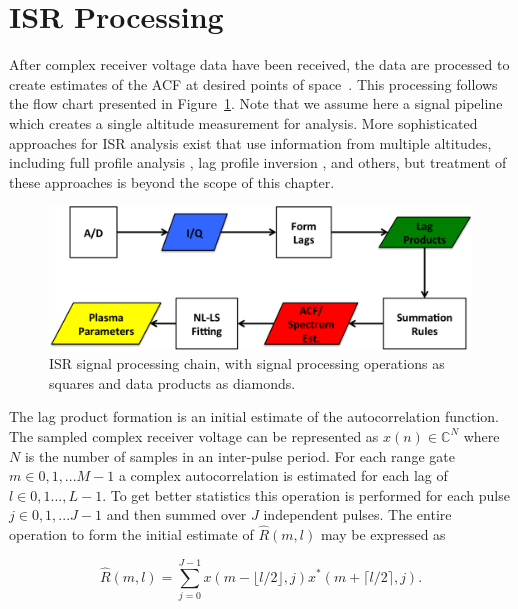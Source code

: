 

\section{ISR Processing}\label{section:isrproc}
After complex receiver voltage data have been received, the data are processed to create estimates of the ACF at desired points of space~\cite{farley1969,nygren1996}. 
This processing follows the flow chart presented in Figure~\ref{fig:chain}.  
Note that we assume here a signal pipeline which creates a single altitude measurement for analysis. 
More sophisticated approaches for ISR analysis exist that use information from multiple altitudes, including full profile analysis \cite{RDS:RDS3308}, lag profile inversion \cite{Virtanen:20082vx}, and others, but treatment of these approaches is beyond the scope of this chapter.
\begin{figure}[!t]
\centering
\includegraphics[width=5.5in]{datastackchain}
\caption{ISR signal processing chain, with signal processing operations as squares and data products as diamonds.}
\label{fig:chain}
\end{figure}
The lag product formation is an initial estimate of the autocorrelation function. The sampled complex receiver voltage can be represented as $x(n) \in\mathbb{C}^N$ where $N$ is the number of samples in an inter-pulse period. For each range gate $m\in 0,1,...M-1$ a complex autocorrelation is estimated for each lag of $l \in 0,1...,L-1$.  To get better statistics this operation is performed for each pulse $j\in 0,1,...J-1$ and then summed over $J$ independent pulses. The entire operation to form the initial estimate of $\widehat{R}(m,l)$ may be expressed as

\begin{equation}
\label{eq:lagpro}
\widehat{R}(m,l) = \displaystyle\sum\limits_{j=0}^{J-1} x(m-\lfloor l/2\rfloor,j)x^*(m+\lceil l/2 \rceil,j).
\end{equation}

